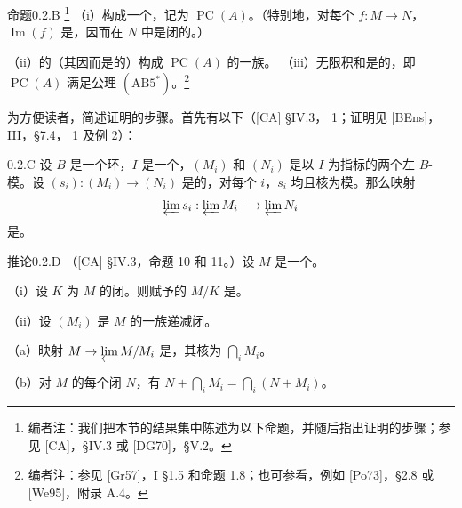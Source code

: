 \begin{SGAresult}{命题}{0.2.B}
\footnote{编者注：我们把本节的结果集中陈述为以下命题，并随后指出证明的步骤；参见 [CA]，\S IV.3 或 [DG70]，\S V.2。}
（i）构成一个，记为 $\operatorname{PC}(A)$。（特别地，对每个 $f:M\to N$，$\operatorname{Im}(f)$ 是，因而在 $N$ 中是闭的。）

（ii）的（其因而是的）构成 $\operatorname{PC}(A)$ 的一族。
（iii）无限积和是的，即 $\operatorname{PC}(A)$ 满足公理 $(\mathrm{AB}5^*)$。\footnote{编者注：参见 [Gr57]，I \S 1.5 和命题 1.8；也可参看，例如 [Po73]，\S 2.8 或 [We95]，附录 A.4。}
\end{SGAresult}
为方便读者，简述证明的步骤。首先有以下（[CA] \S IV.3， 1；证明见 [BEns]，III，\S 7.4， 1 及例 2）：
\begin{SGAresult}{}{0.2.C}
设 $B$ 是一个环，$I$ 是一个，$(M_i)$ 和 $(N_i)$ 是以 $I$ 为指标的两个左 $B$-模。设 $(s_i):(M_i)\to(N_i)$ 是的，对每个 $i$，$s_i$ 均且核为模。那么映射
\[\varprojlim s_i:\varprojlim M_i\longrightarrow\varprojlim N_i\]
是。
\end{SGAresult}
\begin{SGAresult}{推论}{0.2.D}
（[CA] \S IV.3，命题 10 和 11。）设 $M$ 是一个。

（i）设 $K$ 为 $M$ 的闭。则赋予的 $M/K$ 是。

（ii）设 $(M_i)$ 是 $M$ 的一族递减闭。

（a）映射 $M\to\varprojlim M/M_i$ 是，其核为 $\bigcap_iM_i$。

（b）对 $M$ 的每个闭 $N$，有 $N+\bigcap_iM_i=\bigcap_i(N+M_i)$。
\end{SGAresult}
